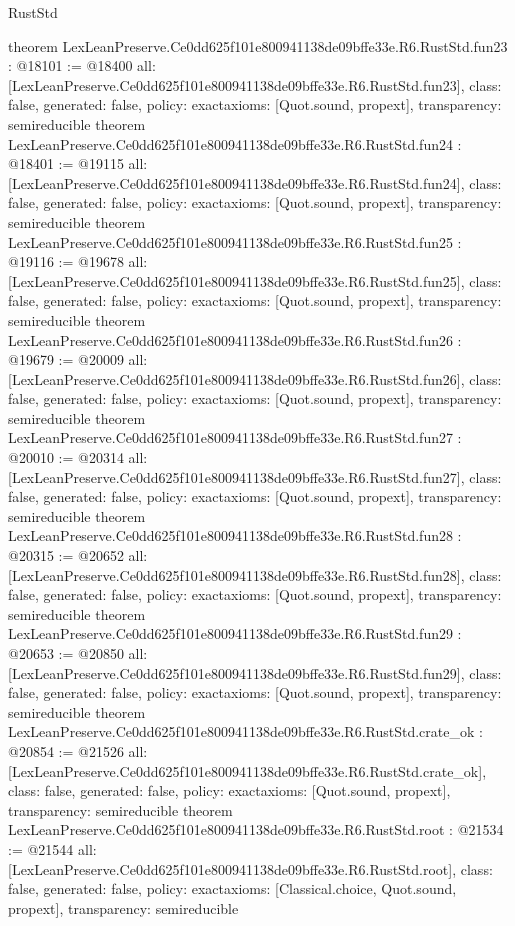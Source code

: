 \begin{lexlean}{RustStd}
\begin{coremodule}
{}
theorem LexLeanPreserve.Ce0dd625f101e800941138de09bffe33e.R6.RustStd.fun23 : @18101 := @18400 {
  all: [LexLeanPreserve.Ce0dd625f101e800941138de09bffe33e.R6.RustStd.fun23],
  class: false,
  generated: false,
  policy: exact{axioms: [Quot.sound, propext]},
  transparency: semireducible
}
theorem LexLeanPreserve.Ce0dd625f101e800941138de09bffe33e.R6.RustStd.fun24 : @18401 := @19115 {
  all: [LexLeanPreserve.Ce0dd625f101e800941138de09bffe33e.R6.RustStd.fun24],
  class: false,
  generated: false,
  policy: exact{axioms: [Quot.sound, propext]},
  transparency: semireducible
}
theorem LexLeanPreserve.Ce0dd625f101e800941138de09bffe33e.R6.RustStd.fun25 : @19116 := @19678 {
  all: [LexLeanPreserve.Ce0dd625f101e800941138de09bffe33e.R6.RustStd.fun25],
  class: false,
  generated: false,
  policy: exact{axioms: [Quot.sound, propext]},
  transparency: semireducible
}
theorem LexLeanPreserve.Ce0dd625f101e800941138de09bffe33e.R6.RustStd.fun26 : @19679 := @20009 {
  all: [LexLeanPreserve.Ce0dd625f101e800941138de09bffe33e.R6.RustStd.fun26],
  class: false,
  generated: false,
  policy: exact{axioms: [Quot.sound, propext]},
  transparency: semireducible
}
theorem LexLeanPreserve.Ce0dd625f101e800941138de09bffe33e.R6.RustStd.fun27 : @20010 := @20314 {
  all: [LexLeanPreserve.Ce0dd625f101e800941138de09bffe33e.R6.RustStd.fun27],
  class: false,
  generated: false,
  policy: exact{axioms: [Quot.sound, propext]},
  transparency: semireducible
}
theorem LexLeanPreserve.Ce0dd625f101e800941138de09bffe33e.R6.RustStd.fun28 : @20315 := @20652 {
  all: [LexLeanPreserve.Ce0dd625f101e800941138de09bffe33e.R6.RustStd.fun28],
  class: false,
  generated: false,
  policy: exact{axioms: [Quot.sound, propext]},
  transparency: semireducible
}
theorem LexLeanPreserve.Ce0dd625f101e800941138de09bffe33e.R6.RustStd.fun29 : @20653 := @20850 {
  all: [LexLeanPreserve.Ce0dd625f101e800941138de09bffe33e.R6.RustStd.fun29],
  class: false,
  generated: false,
  policy: exact{axioms: [Quot.sound, propext]},
  transparency: semireducible
}
theorem LexLeanPreserve.Ce0dd625f101e800941138de09bffe33e.R6.RustStd.crate_ok : @20854 := @21526 {
  all: [LexLeanPreserve.Ce0dd625f101e800941138de09bffe33e.R6.RustStd.crate_ok],
  class: false,
  generated: false,
  policy: exact{axioms: [Quot.sound, propext]},
  transparency: semireducible
}
theorem LexLeanPreserve.Ce0dd625f101e800941138de09bffe33e.R6.RustStd.root : @21534 := @21544 {
  all: [LexLeanPreserve.Ce0dd625f101e800941138de09bffe33e.R6.RustStd.root],
  class: false,
  generated: false,
  policy: exact{axioms: [Classical.choice, Quot.sound, propext]},
  transparency: semireducible
}


\end{coremodule}
\end{lexlean}
